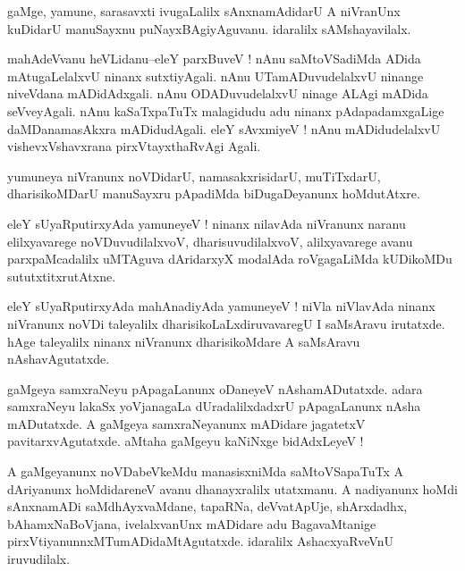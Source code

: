 \documentclass{article}
\begin{document}
\begin{mn}%
gaMge, yamune, sarasavxti ivugaLalilx sAnxnamAdidarU A niVranUnx kuDidarU manuSayxnu 
puNayxBAgiyAguvanu. idaralilx sAMshayavilalx.
\end{mn}

\begin{mn}%
mahAdeVvanu heVLidanu--eleY parxBuveV ! nAnu saMtoVSadiMda ADida mAtugaLelalxvU ninanx 
sutxtiyAgali. nAnu UTamADuvudelalxvU ninange niveVdana mADidAdxgali. nAnu ODADuvudelalxvU 
ninage ALAgi mADida seVveyAgali. nAnu kaSaTxpaTuTx malagidudu adu ninanx pAdapadamxgaLige 
daMDanamasAkxra mADidudAgali. eleY sAvxmiyeV ! nAnu mADidudelalxvU vishevxVshavxrana 
pirxVtayxthaRvAgi Agali.
\end{mn}

\begin{mn}%
yumuneya niVranunx noVDidarU, namasakxrisidarU, muTiTxdarU, dharisikoMDarU manuSayxru 
pApadiMda biDugaDeyanunx hoMdutAtxre.
\end{mn}

\begin{mn}%
eleY sUyaRputirxyAda yamuneyeV ! ninanx nilavAda niVranunx naranu elilxyavarege 
noVDuvudilalxvoV, dharisuvudilalxvoV, alilxyavarege avanu parxpaMcadalilx uMTAguva 
dAridarxyX modalAda roVgagaLiMda kUDikoMDu sututxtitxrutAtxne.
\end{mn}

\begin{mn}%
eleY sUyaRputirxyAda mahAnadiyAda yamuneyeV ! niVla niVlavAda ninanx niVranunx noVDi 
taleyalilx dharisikoLaLxdiruvavaregU I saMsAravu irutatxde. hAge taleyalilx ninanx 
niVranunx dharisikoMdare A saMsAravu nAshavAgutatxde.
\end{mn}

\begin{mn}%
gaMgeya samxraNeyu pApagaLanunx oDaneyeV nAshamADutatxde. adara samxraNeyu lakaSx 
yoVjanagaLa dUradalilxdadxrU pApagaLanunx nAsha mADutatxde. A gaMgeya samxraNeyanunx 
mADidare jagatetxV pavitarxvAgutatxde. aMtaha gaMgeyu kaNiNxge bidAdxLeyeV !
\end{mn}

\begin{mn}%
A gaMgeyanunx noVDabeVkeMdu manasisxniMda saMtoVSapaTuTx A dAriyanunx hoMdidareneV avanu 
dhanayxralilx utatxmanu. A nadiyanunx hoMdi sAnxnamADi saMdhAyxvaMdane, tapaRNa, 
deVvatApUje, shArxdadhx, bAhamxNaBoVjana, ivelalxvanUnx mADidare adu BagavaMtanige 
pirxVtiyanunnxMTumADidaMtAgutatxde. idaralilx AshacxyaRveVnU iruvudilalx.
\end{mn}
\end{document}
